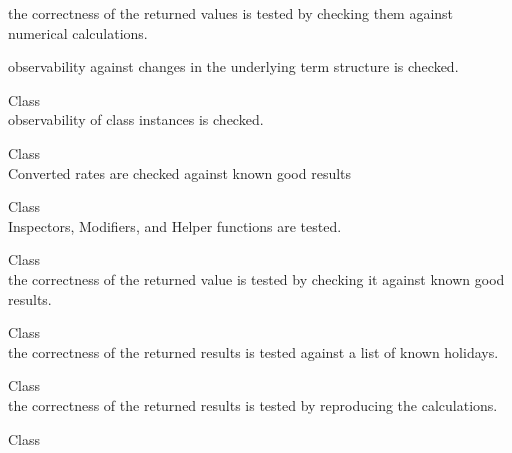 \begin{DoxyRefList}
\begin{DoxyItemize}
\item the correctness of the returned values is tested by checking them against numerical calculations.
\item observability against changes in the underlying term structure is checked. 
\end{DoxyItemize}
\item[Class \doxylink{class_quant_lib_1_1_instrument}{Quant\+Lib\+::Instrument} ]\hfill \\
\label{test__test000017}%
%
observability of class instances is checked.  
\item[Class \doxylink{class_quant_lib_1_1_interest_rate}{Quant\+Lib\+::Interest\+Rate} ]\hfill \\
\label{test__test000027}%
%
Converted rates are checked against known good results  
\item[Class \doxylink{class_quant_lib_1_1_interval_price}{Quant\+Lib\+::Interval\+Price} ]\hfill \\
\label{test__test000092}%
%
Inspectors, Modifiers, and Helper functions are tested.  
\item[Class \doxylink{class_quant_lib_1_1_inverse_cumulative_poisson}{Quant\+Lib\+::Inverse\+Cumulative\+Poisson} ]\hfill \\
\label{test__test000038}%
%
the correctness of the returned value is tested by checking it against known good results.  
\item[Class \doxylink{class_quant_lib_1_1_italy}{Quant\+Lib\+::Italy} ]\hfill \\
\label{test__test000173}%
%
the correctness of the returned results is tested against a list of known holidays.  
\item[Class \doxylink{class_quant_lib_1_1_joint_calendar}{Quant\+Lib\+::Joint\+Calendar} ]\hfill \\
\label{test__test000174}%
%
the correctness of the returned results is tested by reproducing the calculations.  
\item[Class \doxylink{class_quant_lib_1_1_jump_diffusion_engine}{Quant\+Lib\+::Jump\+Diffusion\+Engine} ]\hfill \\
\label{test__test000154}%
%


\end{DoxyRefList}
